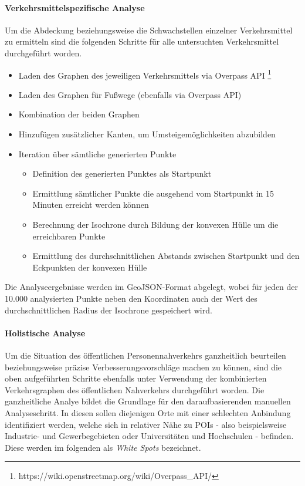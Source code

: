 \paragraph*{Verkehrsmittelspezifische Analyse}
\label{verkehrsmittelspezifische_analyse}

Um die Abdeckung beziehungsweise die Schwachstellen einzelner Verkehrsmittel zu ermitteln sind die folgenden Schritte für alle untersuchten Verkehrsmittel durchgeführt worden.

\begin{itemize}
    \item Laden des Graphen des jeweiligen Verkehrsmittels via Overpass API \footnote{https://wiki.openstreetmap.org/wiki/Overpass\_API/}
    \item Laden des Graphen für Fußwege (ebenfalls via Overpass API)
    \item Kombination der beiden Graphen
    \item Hinzufügen zusätzlicher Kanten, um Umsteigemöglichkeiten abzubilden
    \item Iteration über sämtliche generierten Punkte

    \begin{itemize}
        \item Definition des generierten Punktes als Startpunkt
        \item Ermittlung sämtlicher Punkte die ausgehend vom Startpunkt in 15 Minuten erreicht werden können
        \item Berechnung der Isochrone durch Bildung der konvexen Hülle um die erreichbaren Punkte
        \item Ermittlung des durchschnittlichen Abstands zwischen Startpunkt und den Eckpunkten der konvexen Hülle
    \end{itemize}

\end{itemize}

Die Analyseergebnisse werden im GeoJSON-Format abgelegt, wobei für jeden der 10.000 analysierten Punkte neben den Koordinaten auch der Wert des durchschnittlichen Radius der Isochrone gespeichert wird.

\paragraph*{Holistische Analyse}
\label{holistische_analyse}

Um die Situation des öffentlichen Personennahverkehrs ganzheitlich beurteilen beziehungsweise präzise Verbesserungsvorschläge machen zu können, sind die oben aufgeführten Schritte ebenfalls unter Verwendung der kombinierten Verkehrsgraphen des öffentlichen Nahverkehrs durchgeführt worden. Die ganzheitliche Analye bildet die Grundlage für den daraufbasierenden manuellen Analyseschritt. In diesen sollen diejenigen Orte mit einer schlechten Anbindung identifiziert werden, welche sich in relativer Nähe zu \acp{POI} - also beispielsweise Industrie- und Gewerbegebieten oder Universitäten und Hochschulen - befinden. Diese werden im folgenden als \emph{White Spots} bezeichnet.

